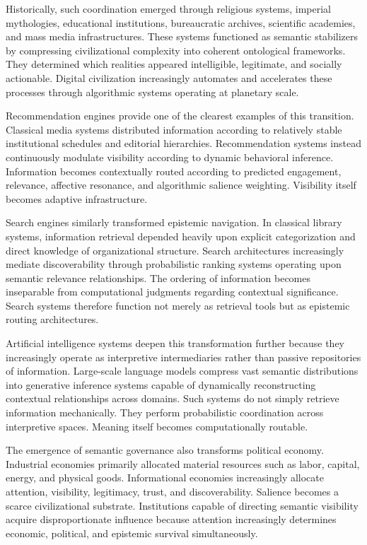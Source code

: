 \documentclass[11pt,a4paper]{article}
\begin{document}
Historically, such coordination emerged through religious systems, imperial mythologies, educational institutions, bureaucratic archives, scientific academies, and mass media infrastructures. These systems functioned as semantic stabilizers by compressing civilizational complexity into coherent ontological frameworks. They determined which realities appeared intelligible, legitimate, and socially actionable. Digital civilization increasingly automates and accelerates these processes through algorithmic systems operating at planetary scale.

Recommendation engines provide one of the clearest examples of this transition. Classical media systems distributed information according to relatively stable institutional schedules and editorial hierarchies. Recommendation systems instead continuously modulate visibility according to dynamic behavioral inference. Information becomes contextually routed according to predicted engagement, relevance, affective resonance, and algorithmic salience weighting. Visibility itself becomes adaptive infrastructure.

Search engines similarly transformed epistemic navigation. In classical library systems, information retrieval depended heavily upon explicit categorization and direct knowledge of organizational structure. Search architectures increasingly mediate discoverability through probabilistic ranking systems operating upon semantic relevance relationships. The ordering of information becomes inseparable from computational judgments regarding contextual significance. Search systems therefore function not merely as retrieval tools but as epistemic routing architectures.

Artificial intelligence systems deepen this transformation further because they increasingly operate as interpretive intermediaries rather than passive repositories of information. Large-scale language models compress vast semantic distributions into generative inference systems capable of dynamically reconstructing contextual relationships across domains. Such systems do not simply retrieve information mechanically. They perform probabilistic coordination across interpretive spaces. Meaning itself becomes computationally routable.

The emergence of semantic governance also transforms political economy. Industrial economies primarily allocated material resources such as labor, capital, energy, and physical goods. Informational economies increasingly allocate attention, visibility, legitimacy, trust, and discoverability. Salience becomes a scarce civilizational substrate. Institutions capable of directing semantic visibility acquire disproportionate influence because attention increasingly determines economic, political, and epistemic survival simultaneously.
\end{document}
